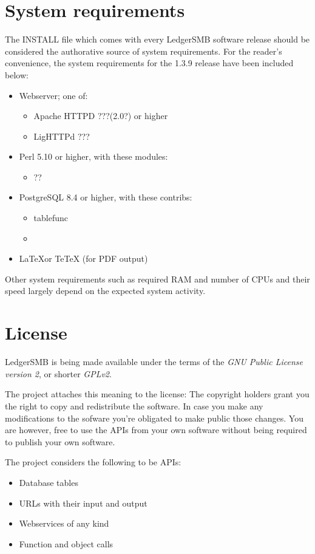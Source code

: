 \documentclass[10pt,A4]{book}
\begin{document}
\section{System requirements}

The INSTALL file which comes with every LedgerSMB software release should be
considered the authorative source of system requirements.  For the reader's
convenience, the system requirements for the 1.3.9 release have been included
below:

\begin{itemize}
\item Webserver; one of:
\begin{itemize}
\item Apache HTTPD ???(2.0?) or higher
\item LigHTTPd ???
\end{itemize}
\item Perl 5.10 or higher, with these modules:
\begin{itemize}
\item ??
\end{itemize}
\item PostgreSQL 8.4 or higher, with these contribs:
\begin{itemize}
\item tablefunc
\item 
\end{itemize}
\item \LaTeX or TeTeX (for PDF output)
\end{itemize}

Other system requirements such as required RAM and number of CPUs and their speed
largely depend on the expected system activity.

\section{License}

LedgerSMB is being made available under the terms of the
\textit{GNU Public License version 2}, or shorter \textit{GPLv2}.

The project attaches this meaning to the license:
The copyright holders grant you the right to copy and
redistribute the software.  In case you make any modifications to the sofware
you're obligated to make public those changes.  You are however, free to use
the APIs from your own software without being required to publish your own software.

The project considers the following to be APIs:
\begin{itemize}
\item Database tables
\item URLs with their input and output
\item Webservices of any kind
\item Function and object calls
\end{itemize}
\end{document}
